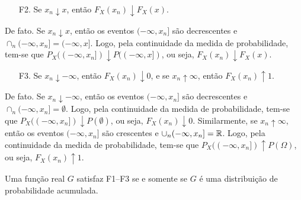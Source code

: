 \begin{frame}
\begin{block}{}

\begin{enumerate}
\item[F2.] Se $x_n\downarrow x$, então $F_X(x_n)\downarrow F_X(x)$.
\end{enumerate}
De fato. Se $x_n\downarrow x$, então os eventos $(-\infty, x_n]$ são
decrescentes e $\cap_n(-\infty, x_n]=(-\infty, x]$. Logo, pela
continuidade da medida de probabilidade, tem-se que $P_X((-\infty,
x_n])\downarrow P((-\infty, x])$, ou seja, $F_X(x_n)\downarrow
F_X(x)$.
\end{block}

\begin{block}{}

\begin{enumerate}
\item[F3.] Se $x_n\downarrow -\infty$, então $F_X(x_n)\downarrow 0$, e se $x_n\uparrow \infty$, então $F_X(x_n)\uparrow 1$.
\end{enumerate}
De fato. Se $x_n\downarrow -\infty$, então os eventos $(-\infty, x_n]$ são
decrescentes e $\cap_n (-\infty, x_n]=\emptyset$. Logo, pela
continuidade da medida de probabilidade, tem-se que $P_X((-\infty,
x_n])\downarrow P(\emptyset)$, ou seja, $F_X(x_n)\downarrow 0$.
Similarmente, se $x_n\uparrow \infty$, então os eventos $(-\infty,
x_n]$ são crescentes e $\cup_n (-\infty, x_n]=\mathbb{R}$. Logo, pela
continuidade da medida de probabilidade, tem-se que $P_X((-\infty,
x_n])\uparrow P(\Omega)$, ou seja, $F_X(x_n)\uparrow 1$.

\end{block}
\begin{teo}
\label{thm:acumula}
Uma função real $G$ satisfaz F1--F3 se e somente se $G$ é uma
distribuição de probabilidade acumulada.
\end{teo}
\end{frame}

